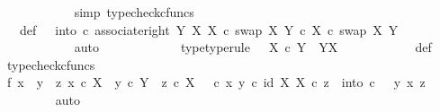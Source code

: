 \begin{isabellebody}
\ \ \ \ \ \ \ \ \ \ \isamarkupfalse%
\ {\isacharparenleft}{\kern0pt}simp{\isacharcomma}{\kern0pt}\ typecheck{\isacharunderscore}{\kern0pt}cfuncs{\isacharparenright}{\kern0pt}\isanewline
\ \ \ \isanewline
\isanewline
\ \ \ \ \ \ \ \ \isamarkupfalse%
\ {\isasymTheta}\ \ {\isasymTheta}{\isacharunderscore}{\kern0pt}def{\isacharcolon}{\kern0pt}\ {\isachardoublequoteopen}{\isasymTheta}\ {\isacharequal}{\kern0pt}\ {\isacharparenleft}{\kern0pt}into\ {\isasymcirc}\isactrlsub c\ associate{\isacharunderscore}{\kern0pt}right\ Y\ X\ X\ {\isasymcirc}\isactrlsub c\ swap\ X\ {\isacharparenleft}{\kern0pt}Y\ {\isasymtimes}\isactrlsub c\ X{\isacharparenright}{\kern0pt}{\isacharparenright}{\kern0pt}\isactrlsup {\isasymsharp}\ {\isasymcirc}\isactrlsub c\ swap\ X\ Y{\isachardoublequoteclose}\isanewline
\ \ \ \ \ \ \ \ \ \ \isamarkupfalse%
\ auto\isanewline
\ \ \isanewline
\ \ \ \ \ \ \ \ \isamarkupfalse%
\ {\isasymTheta}{\isacharunderscore}{\kern0pt}type{\isacharbrackleft}{\kern0pt}type{\isacharunderscore}{\kern0pt}rule{\isacharbrackright}{\kern0pt}{\isacharcolon}{\kern0pt}\ {\isachardoublequoteopen}{\isasymTheta}\ {\isacharcolon}{\kern0pt}\ X\ {\isasymtimes}\isactrlsub c\ Y\ {\isasymrightarrow}\ Y\isactrlbsup X\isactrlesup {\isachardoublequoteclose}\isanewline
\ \ \ \ \ \ \ \ \ \ \isamarkupfalse%
\ {\isasymTheta}{\isacharunderscore}{\kern0pt}def\ \isamarkupfalse%
\ typecheck{\isacharunderscore}{\kern0pt}cfuncs\isanewline
\isanewline
\ \ \ \ \ \ \ \ \isamarkupfalse%
\ f{}{\isacharcolon}{\kern0pt}\ {\isachardoublequoteopen}{\isasymAnd}x{\isachardot}{\kern0pt}\ {\isasymAnd}\ y{\isachardot}{\kern0pt}\ {\isasymAnd}\ z{\isachardot}{\kern0pt}\ x\ {\isasymin}\isactrlsub c\ X\ {\isasymand}\ y\ {\isasymin}\isactrlsub c\ Y\ {\isasymand}\ z\ {\isasymin}\isactrlsub c\ X\ {\isasymLongrightarrow}\ {\isacharparenleft}{\kern0pt}{\isasymTheta}\ {\isasymcirc}\isactrlsub c\ {\isasymlangle}x{\isacharcomma}{\kern0pt}\ y{\isasymrangle}{\isacharparenright}{\kern0pt}\isactrlsup {\isasymflat}\ {\isasymcirc}\isactrlsub c\ {\isasymlangle}id\ X{\isacharcomma}{\kern0pt}\ {\isasymbeta}\isactrlbsub X\isactrlesub {\isasymrangle}\ {\isasymcirc}\isactrlsub c\ z\ {\isacharequal}{\kern0pt}\ into\ {\isasymcirc}\isactrlsub c\ \ \ {\isasymlangle}y{\isacharcomma}{\kern0pt}\ {\isasymlangle}x{\isacharcomma}{\kern0pt}\ z{\isasymrangle}{\isasymrangle}{\isachardoublequoteclose}\isanewline
\ \ \ \ \ \ \ \ \isamarkupfalse%
{\isacharparenleft}{\kern0pt}auto{\isacharparenright}{\kern0pt}\isanewline

\end{isabellebody}
